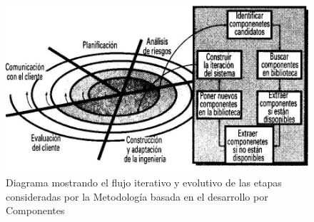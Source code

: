 \begin{figure}[!h]
	\centering
	\includegraphics[width=14cm]{Imagenes/Modelo_componentes.jpeg}
	\caption{Diagrama mostrando el flujo iterativo y evolutivo de las etapas consideradas por la Metodología basada en el desarrollo por Componentes}
	\label{Metodologia_componentes}
\end{figure}